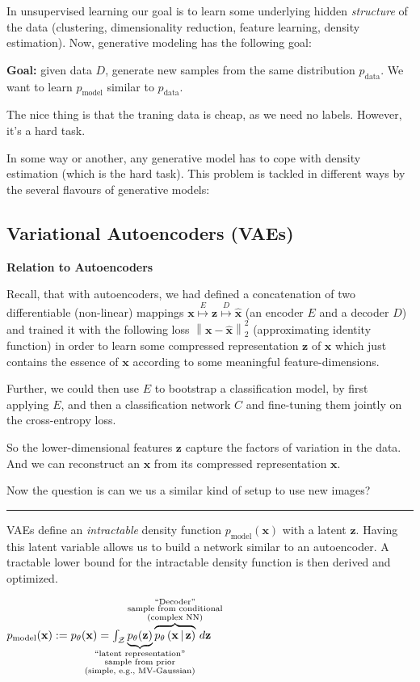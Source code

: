 \documentclass[a2paper,8pt]{extarticle}
\newcommand{\cZ}{\mathcal{Z}}
\newcommand{\norm}[1]{\left\lVert #1 \right\rVert}
\newcommand{\cDist}[3]{#1\left( #2 \,\middle|\, #3 \right)}
\renewcommand{\vec}[1]{\mathbf{#1}}
\newcommand{\vx}{\vec{x}}
\newcommand{\vz}{\vec{z}}
\newcommand{\vhx}{\widehat{\vec{x}}}
\newcommand{\sep}{\vspace{0pt}\noindent\hrule\vspace{0pt}}
\newcommand{\sep}{\vspace{5pt}\noindent\hrule\vspace{5pt}}
\begin{document}
\begin{landscape}
\begin{multicols*}{7}
In unsupervised learning our goal is to learn some underlying hidden
\emph{structure} of the data (clustering, dimensionality reduction, feature
learning, density estimation). Now, generative modeling has the following goal:

\textbf{Goal:} given data $D$, generate new samples from the same
distribution $p_{\text{data}}$. We want to learn $p_{\text{model}}$ similar to
$p_{\text{data}}$.

The nice thing is that the traning data is cheap, as we need no labels. However,
it's a hard task.

In some way or another, any generative model has to cope with density
estimation (which is the hard task). This problem is tackled in different
ways by the several flavours of generative models:



\subsection{Variational Autoencoders (VAEs)}

\textbf{Relation to Autoencoders}

Recall, that with autoencoders, we had defined a concatenation of two
differentiable (non-linear) mappings
$\vx\stackrel{E}{\mapsto}\vz\stackrel{D}{\mapsto}\vhx$ (an encoder $E$ and a
decoder $D$) and trained it with the following loss $\norm{\vx-\vhx}_2^2$
(approximating identity function) in order to learn some compressed
representation $\vz$ of $\vx$ which just contains the essence of $\vx$ according
to some meaningful feature-dimensions.

Further, we could then use $E$ to bootstrap a classification model, by first
applying $E$, and then a classification network $C$ and fine-tuning them jointly
on the cross-entropy loss.

So the lower-dimensional features $\vz$ capture the factors of variation in
the data. And we can reconstruct an $\vx$ from its compressed representation
$\vx$.

Now the question is can we us a similar kind of setup to use new images?

\sep

VAEs define an \emph{intractable} density function $p_{\text{model}}(\vx)$ with
a latent $\vz$. Having this latent variable allows us to build a network
similar to an autoencoder. A tractable lower bound for the intractable density
function is then derived and optimized.

$
p_{\text{model}}(\vx):=
p_\theta(\vx)=\int_{\cZ}
\underbrace{p_\theta(\vz)}_{\mathclap{\substack{
\text{``latent representation''}\\
\text{sample from prior}\\
\text{(simple, e.g., MV-Gaussian)}}}}
\overbrace{\cDist{p_\theta}{\vx}{\vz}}^{\mathclap{\substack{
\text{``Decoder''}\\
\text{sample from conditional}\\
\text{(complex NN)}}}} \,d\vz 
$


\end{multicols*}
\end{landscape}
\end{document}
